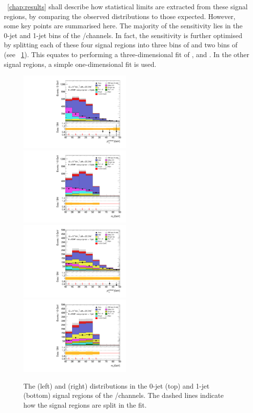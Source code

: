 \Chapter~\ref{chap:results} shall describe how statistical limits are extracted from these 
signal regions, by comparing the observed \mt distributions to those expected. However, some 
key points are summarised here. The majority of the sensitivity lies in the 0-jet and 1-jet 
bins of the \emch/\mech channels. In fact, the sensitivity is further optimised by splitting 
each of these four signal regions into three bins of \ptsubleadlep and two bins of \mll 
(see \Figure~\ref{fig:sel:df_split_sr}). This equates to performing a three-dimensional fit 
of \mt, \mll and \ptsubleadlep. In the other signal regions, a simple one-dimensional \mt 
fit is used.

\begin{figure}[p]
	\includegraphics[width=0.495\textwidth]{tex/selection/emme_CutFRecoil_0jet_lepPtSublead_zoom_mh125_lin}
	\hfill
	\includegraphics[width=0.495\textwidth]{tex/selection/emme_CutFRecoil_0jet_Mll_zoom_mh125_lin}
	\\
	\includegraphics[width=0.495\textwidth]{tex/selection/emme_CutFRecoil_1jet_lepPtSublead_zoom_mh125_lin}
	\hfill
	\includegraphics[width=0.495\textwidth]{tex/selection/emme_CutFRecoil_1jet_Mll_zoom_mh125_lin}
	\caption{The \ptsubleadlep (left) and \mll (right) distributions in the 0-jet (top) and 
	1-jet (bottom) signal regions of the \emch/\mech channels. The dashed lines indicate 
	how the signal regions are split in the fit.}
	\label{fig:sel:df_split_sr}
\end{figure}


